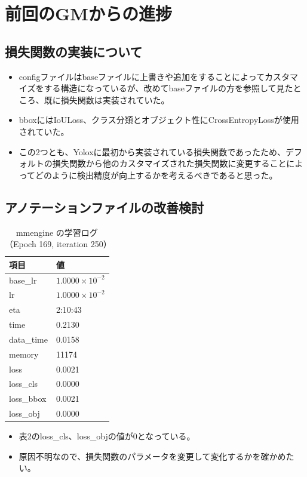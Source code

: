 \documentclass[a4j]{jarticle}
\begin{document}
	\section{前回のGMからの進捗}
	\subsection{損失関数の実装について}
	\begin{itemize}
		\item configファイルはbaseファイルに上書きや追加をすることによってカスタマイズをする構造になっているが、改めてbaseファイルの方を参照して見たところ、既に損失関数は実装されていた。
		\item bboxにはIoULoss、クラス分類とオブジェクト性にCrossEntropyLossが使用されていた。
		\item この2つとも、Yoloxに最初から実装されている損失関数であったため、デフォルトの損失関数から他のカスタマイズされた損失関数に変更することによってどのように検出精度が向上するかを考えるべきであると思った。
	\end{itemize}
	\subsection{アノテーションファイルの改善検討}
	\begin{table}[htbp]
		\centering
		\begin{tabular}{|l|l|}
			\hline
			\textbf{項目} & \textbf{値} \\
			\hline
			base\_lr & $1.0000 \times 10^{-2}$ \\
			lr & $1.0000 \times 10^{-2}$ \\
			eta & 2:10:43 \\
			time & 0.2130 \\
			data\_time & 0.0158 \\
			memory & 11174 \\
			loss & 0.0021 \\
			loss\_cls & 0.0000 \\
			loss\_bbox & 0.0021 \\
			loss\_obj & 0.0000 \\
			\hline
		\end{tabular}
		\caption{mmengine の学習ログ（Epoch 169, iteration 250）}
	\end{table}
	\begin{itemize}
		\item 表2のloss\_cls、loss\_objの値が0となっている。
		\item 原因不明なので、損失関数のパラメータを変更して変化するかを確かめたい。
	\end{itemize}
\end{document}
